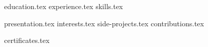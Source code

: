 \documentclass[10pt, a4paper]{awesome-cv}
\newcommand*{\sectiondir}{resume/}
\begin{document}
\makecvheader[L]




{education.tex}
{experience.tex}
{skills.tex}



{presentation.tex}
{interests.tex}
{side-projects.tex}
{contributions.tex}

{certificates.tex}

\end{document}
